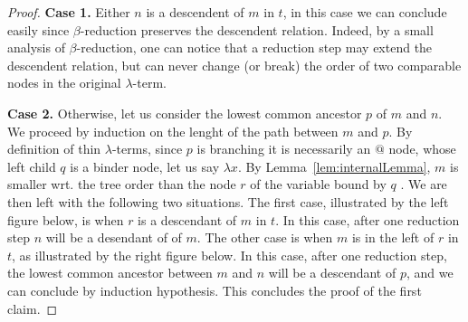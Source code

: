 \begin{proof}
\textbf{Case 1.} Either $n$ is a descendent of $m$ in $t$, in this case we can conclude easily since $\beta$-reduction preserves the descendent relation. Indeed, by a small analysis of $\beta$-reduction, one can notice that a reduction step may extend the descendent relation, but can never change (or break) the order of two comparable nodes in the original $\lambda$-term.    

\textbf{Case 2.} Otherwise, let us consider the lowest common ancestor $p$ of $m$ and $n$. We proceed by induction on the lenght of the path between $m$ and $p$. By definition of thin $\lambda$-terms, since $p$ is branching it is necessarily an $@$ node, whose left child $q$ is a binder node, let us say $\lambda x$. 
By Lemma~\ref{lem:internalLemma}, $m$ is smaller wrt. the tree order than the node $r$ of the variable bound by $q$ . 
We are then left with the following two situations. The first case, illustrated by the left figure below, is when $r$ is a descendant of $m$ in $t$. In this case, after one reduction step $n$ will be a desendant of of $m$. The other case is when $m$ is in the left of $r$ in $t$, as illustrated by the right figure below. In this case, after one reduction step, the lowest common ancestor between $m$ and $n$ will be a descendant of $p$, and we can conclude by induction hypothesis. This concludes the proof of the first claim.


\end{proof}
